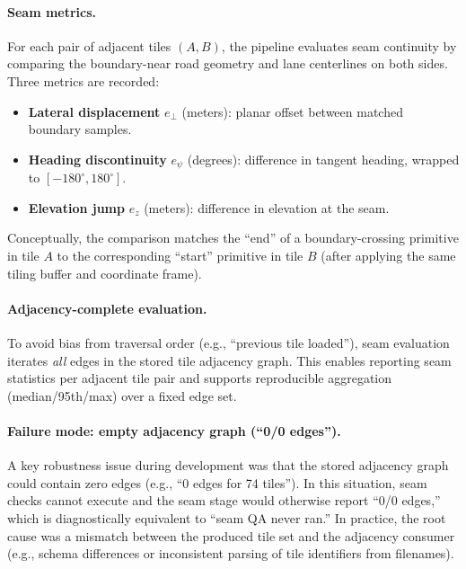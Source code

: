 \paragraph{Seam metrics.}
For each pair of adjacent tiles $(A,B)$, the pipeline evaluates seam continuity by comparing the boundary-near road geometry and lane centerlines on both sides. Three metrics are recorded:
\begin{itemize}
    \item \textbf{Lateral displacement} $e_{\perp}$ (meters): planar offset between matched boundary samples.
    \item \textbf{Heading discontinuity} $e_{\psi}$ (degrees): difference in tangent heading, wrapped to $[-180^\circ, 180^\circ]$.
    \item \textbf{Elevation jump} $e_{z}$ (meters): difference in elevation at the seam.
\end{itemize}
Conceptually, the comparison matches the ``end'' of a boundary-crossing primitive in tile $A$ to the corresponding ``start'' primitive in tile $B$ (after applying the same tiling buffer and coordinate frame).

\paragraph{Adjacency-complete evaluation.}
To avoid bias from traversal order (e.g., ``previous tile loaded''), seam evaluation iterates \emph{all} edges in the stored tile adjacency graph. This enables reporting seam statistics per adjacent tile pair and supports reproducible aggregation (median/95th/max) over a fixed edge set.

\paragraph{Failure mode: empty adjacency graph (``0/0 edges'').}
A key robustness issue during development was that the stored adjacency graph could contain zero edges (e.g., ``0 edges for 74 tiles''). In this situation, seam checks cannot execute and the seam stage would otherwise report ``0/0 edges,'' which is diagnostically equivalent to ``seam QA never ran.'' In practice, the root cause was a mismatch between the produced tile set and the adjacency consumer (e.g., schema differences or inconsistent parsing of tile identifiers from filenames).

